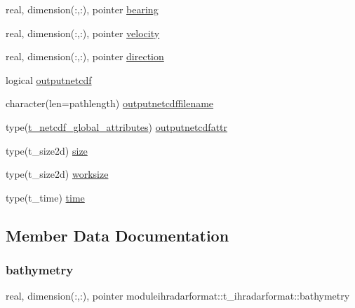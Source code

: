 \begin{DoxyCompactItemize}
\item 
real, dimension(\+:,\+:), pointer \mbox{\hyperlink{structmoduleihradarformat_1_1t__ihradarformat_a2ea3a9b6ae68500dedefb11744fe810f}{bearing}}
\item 
real, dimension(\+:,\+:), pointer \mbox{\hyperlink{structmoduleihradarformat_1_1t__ihradarformat_adca6cc08820eea67f9c76d8352f120be}{velocity}}
\item 
real, dimension(\+:,\+:), pointer \mbox{\hyperlink{structmoduleihradarformat_1_1t__ihradarformat_a4730b1e2fc20df6df644471e3a666659}{direction}}
\item 
logical \mbox{\hyperlink{structmoduleihradarformat_1_1t__ihradarformat_a3f9ac80eb03d963155ebe63fb3bf3f18}{outputnetcdf}}
\item 
character(len=pathlength) \mbox{\hyperlink{structmoduleihradarformat_1_1t__ihradarformat_af19cc4a9c729ad8f82c2dca40366e91b}{outputnetcdffilename}}
\item 
type(\mbox{\hyperlink{structmoduleihradarformat_1_1t__netcdf__global__attributes}{t\+\_\+netcdf\+\_\+global\+\_\+attributes}}) \mbox{\hyperlink{structmoduleihradarformat_1_1t__ihradarformat_ae927f8c4721214aa435c5a84a5ffcf2e}{outputnetcdfattr}}
\item 
type(t\+\_\+size2d) \mbox{\hyperlink{structmoduleihradarformat_1_1t__ihradarformat_ac50b2383a6979fc42c223c1f6f23709a}{size}}
\item 
type(t\+\_\+size2d) \mbox{\hyperlink{structmoduleihradarformat_1_1t__ihradarformat_a43f3e736a9a764c853be3b7395968657}{worksize}}
\item 
type(t\+\_\+time) \mbox{\hyperlink{structmoduleihradarformat_1_1t__ihradarformat_ac7aff5bc02bc7efd2acc384d0217de51}{time}}
\end{DoxyCompactItemize}


\subsection{Member Data Documentation}
\mbox{\label{structmoduleihradarformat_1_1t__ihradarformat_a5f5419a5121e82f2a0780d8b31067387}} 
\subsubsection{\texorpdfstring{bathymetry}{bathymetry}}
{\footnotesize\ttfamily real, dimension(\+:,\+:), pointer moduleihradarformat\+::t\+\_\+ihradarformat\+::bathymetry\hspace{0.3cm}{\ttfamily [private]}}

